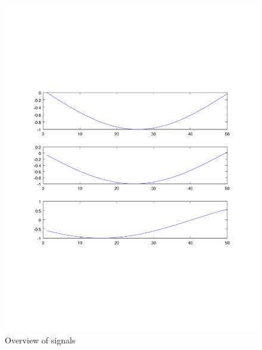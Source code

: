 \begin{figure}
\centering
\includegraphics[scale=0.4]{Figures/lofreq}
\caption{Overview of signals}
\label{fig:windowslo100}
\end{figure}

